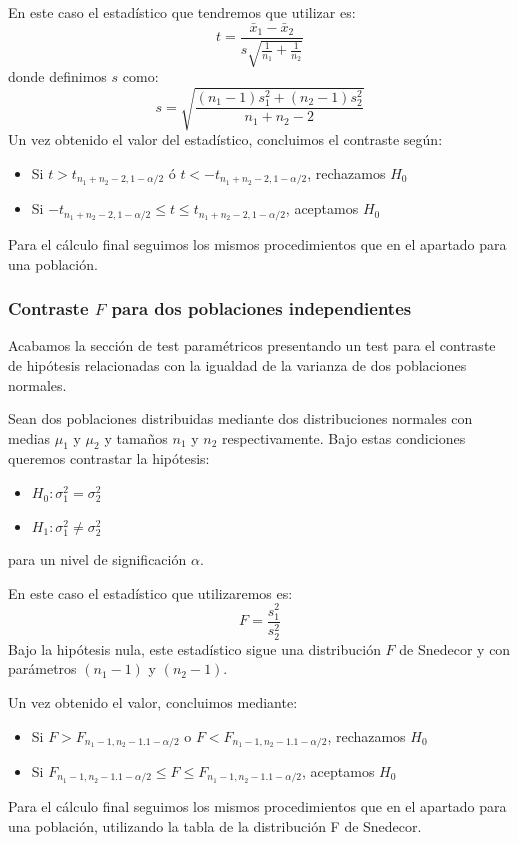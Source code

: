 \documentclass[a4paper,12pt]{article}
\begin{document}
En este caso el estadístico que tendremos que utilizar es: 
\begin{equation}
    t
    =
    \frac{\bar{x}_1-\bar{x}_2}{s\sqrt{\frac{1}{n_1}+\frac{1}{n_2}}}
\end{equation}
donde definimos $s$ como:
\begin{equation}
    s=\sqrt{\frac{(n_1-1)s_1^2+(n_2-1)s_2^2}{n_1+n_2-2}}
\end{equation}
Un vez obtenido el valor del estadístico, concluimos el contraste según:
\begin{itemize}
	\item Si $t > t_{n_1+n_2-2,1-\alpha/2}$ ó $t < -t_{n_1+n_2-2,1-\alpha/2}$, rechazamos $H_0$
	\item Si $-t_{n_1+n_2-2,1-\alpha/2}\leq t\leq t_{n_1+n_2-2,1-\alpha/2}$, aceptamos $H_0$
\end{itemize}
Para el cálculo final seguimos los mismos procedimientos que en el apartado para una población.

\subsubsection{Contraste $F$ para dos poblaciones independientes }
\label{sec:F_2samples}
Acabamos la sección de test paramétricos presentando un test para el contraste de hipótesis relacionadas con la igualdad de la varianza de dos poblaciones normales.

    Sean dos poblaciones distribuidas mediante dos distribuciones normales con medias $\mu_1$ y $\mu_2$ y  tamaños $n_1$ y $n_2$ respectivamente.
    Bajo estas condiciones queremos contrastar la hipótesis:
    \begin{itemize}
	\item $H_0:\sigma^2_1=\sigma^2_2$
	\item $H_1:\sigma^2_1\neq \sigma^2_2$
    \end{itemize}
    para un nivel de significación $\alpha$.

    En este caso el estadístico que utilizaremos es: 
    $$F=\frac{s_1^2}{s_2^2}$$
    Bajo la hipótesis nula, este estadístico sigue una distribución $F$ de Snedecor y con parámetros $(n_1 - 1)$ y $(n_2 - 1)$.

    Un vez obtenido el valor, concluimos mediante:
    \begin{itemize}
	\item Si $F>F_{n_1-1,n_2-1.1-\alpha/2}$ o $F<F_{n_1-1,n_2-1.1-\alpha/2}$, rechazamos $H_0$
	\item Si $F_{n_1-1,n_2-1.1-\alpha/2}\leq F \leq F_{n_1-1,n_2-1.1-\alpha/2}$, aceptamos $H_0$
    \end{itemize}
    Para el cálculo final seguimos los mismos procedimientos que en el apartado para una población, utilizando la tabla de la distribución F de Snedecor.
\end{document}

